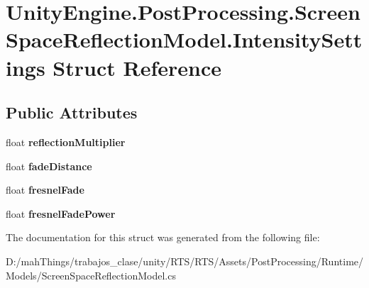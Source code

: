 \hypertarget{struct_unity_engine_1_1_post_processing_1_1_screen_space_reflection_model_1_1_intensity_settings}{}\section{Unity\+Engine.\+Post\+Processing.\+Screen\+Space\+Reflection\+Model.\+Intensity\+Settings Struct Reference}
\label{struct_unity_engine_1_1_post_processing_1_1_screen_space_reflection_model_1_1_intensity_settings}
\subsection*{Public Attributes}
\begin{DoxyCompactItemize}
\item 
\mbox{\label{struct_unity_engine_1_1_post_processing_1_1_screen_space_reflection_model_1_1_intensity_settings_a8ec48b86aaff338720873b3e43c49b2f}} 
float {\bfseries reflection\+Multiplier}
\item 
\mbox{\label{struct_unity_engine_1_1_post_processing_1_1_screen_space_reflection_model_1_1_intensity_settings_a50700644ca17276c6f9c09bbbe53254d}} 
float {\bfseries fade\+Distance}
\item 
\mbox{\label{struct_unity_engine_1_1_post_processing_1_1_screen_space_reflection_model_1_1_intensity_settings_a597e8b8b62d8004069320a12fb793efd}} 
float {\bfseries fresnel\+Fade}
\item 
\mbox{\label{struct_unity_engine_1_1_post_processing_1_1_screen_space_reflection_model_1_1_intensity_settings_ab03bececad8d540f7619542a5bb3f9fb}} 
float {\bfseries fresnel\+Fade\+Power}
\end{DoxyCompactItemize}


The documentation for this struct was generated from the following file\+:\begin{DoxyCompactItemize}
\item 
D\+:/mah\+Things/trabajos\+\_\+clase/unity/\+R\+T\+S/\+R\+T\+S/\+Assets/\+Post\+Processing/\+Runtime/\+Models/Screen\+Space\+Reflection\+Model.\+cs\end{DoxyCompactItemize}
